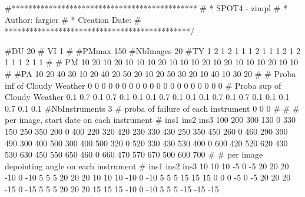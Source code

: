 #*********************************************
# * SPOT4 - zimpl
# * Author: fargier
# * Creation Date:
#  *********************************************/


#DU
20
# VI
1
#
#PMmax
150
#NbImages
20
#TY
1
2
1
2
1
1
1
2
1
1
1
2
1
2
1
1
1
2
1
1
#
# PM
10
20
10
20
10
10
10
20
10
10
10
20
10
20
10
10
10
20
10
10
#
#PA
10
20
40
30
10
20
40
20
50
20
10
20
50
30
20
10
40
10
30
20
#
# Proba inf of Cloudy Weather
0
0
0
0
0
0
0
0
0
0
0
0
0
0
0
0
0
0
0
0
# Proba sup of Cloudy Weather
0.1
0.7
0.1
0.7
0.1
0.1
0.1
0.7
0.1
0.1
0.1
0.7
0.1
0.7
0.1
0.1
0.1
0.7
0.1
0.1
#NbInstruments
3
# proba of failure of each instrument
0
0
0
#
#
# per image, start date on each instrument
# ins1 ins2 ins3
100 200 300
130 0 330
150 250 350
200 0 400
220 320 420
230 330 430
250 350 450
260 0 460
290 390 490
300 400 500
300 400 500
320 0 520
330 430 530
400 0 600
420 520 620
430 530 630
450 550 650
460 0 660
470 570 670
500 600 700
#
# per image depointing angle on each instrument
# ins1 ins2 ins3
10 10 10
-5 0 -5
20 20 20
-10 0 -10
5 5 5
20 20 20
10 10 10
-10 0 -10
5 5 5
15 15 15
0 0 0
-5 0 -5
20 20 20
-15 0 -15
5 5 5
20 20 20
15 15 15
-10 0 -10
5 5 5
-15 -15 -15


